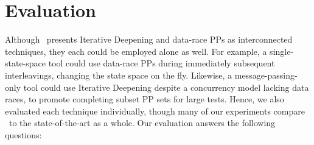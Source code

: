 \section{Evaluation}
\label{sec:eval}

Although \quicksand~presents Iterative Deepening and data-race PPs as interconnected techniques, they each could be employed alone as well. %
For example, a single-state-space tool could use data-race PPs during immediately subsequent interleavings,
changing the state space on the fly.
Likewise, a message-passing-only tool could use Iterative Deepening despite a concurrency model lacking data races, %
to promote completing subset PP sets for large tests.
Hence,
we also evaluated each technique individually,
though many of our experiments compare \quicksand~to the state-of-the-art as a whole.
Our evaluation answers the following questions:
